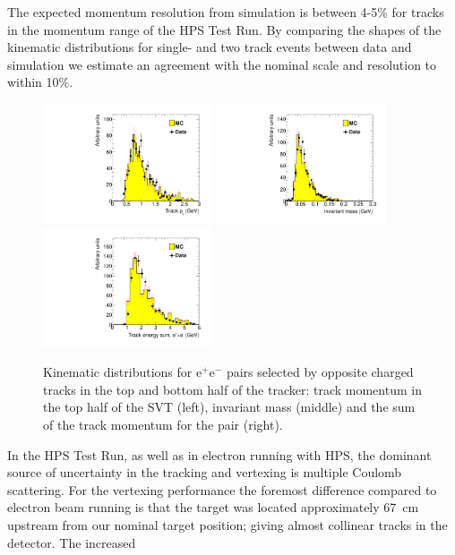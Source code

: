 \documentclass[final,3p,times,twocolumn]{elsarticle}
\newcommand{\ee}{e$^+$e$^-$}
\begin{document}
The expected momentum resolution from simulation is between 4-5\% for tracks in the momentum 
range of the HPS Test Run. By comparing the shapes of the kinematic distributions for single- and two 
track events between data and simulation we estimate an agreement with the nominal scale and 
resolution to within 10\%.
 \begin{center}
{\small
\begin{figure}[t]
   \includegraphics[width=5cm]{figures/h_trk_top_px_h_trk_top_px_trigsel4hit_pair1351_twotrkfilt-v6-paper}
   \includegraphics[width=5cm]{figures/h_invM_h_invM_trigsel4hit_pair1351_twotrkfilt-v6-paper}
   \includegraphics[width=5cm]{figures/h_sumE_h_sumE_trigsel4hit_pair1351_twotrkfilt-v6-paper}
\caption{Kinematic distributions for \ee{} pairs selected by opposite charged tracks in the top and bottom half of the tracker: track momentum in the top half of the SVT (left), invariant mass (middle) and the sum of the track momentum for the pair (right).}
\label{fig:pair_kin}
\end{figure}
}
\end{center}
In the HPS Test Run, as well as in electron running with HPS, the dominant source of uncertainty in the 
tracking and vertexing is multiple Coulomb scattering. For the vertexing performance the foremost 
difference compared to electron beam running is that the target was located approximately 67~cm 
upstream from our nominal target position; giving almost collinear tracks in the detector. The increased 
\end{document}
